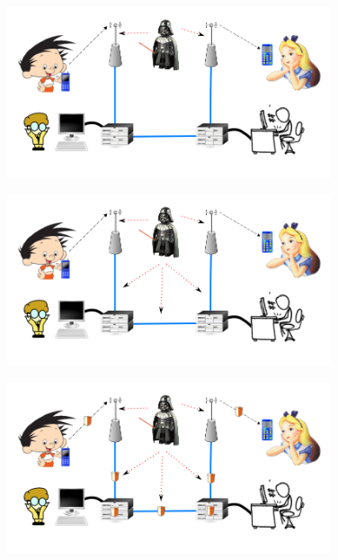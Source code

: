 \documentclass[notes,blue,mathserif]{beamer}
\begin{document}
\begin{frame}{}
\begin{figure}
	\centering
		\includegraphics[width=0.85\textwidth]{figuras/5.png}
	\label{fig:arq5}
\end{figure}
\end{frame}

\begin{frame}{}
\begin{figure}
	\centering
		\includegraphics[width=0.85\textwidth]{figuras/6.png}
	\label{fig:arq6}
\end{figure}
\end{frame}

\begin{frame}{}
\begin{figure}
	\centering
		\includegraphics[width=0.85\textwidth]{figuras/7.png}
	\label{fig:arq7}
\end{figure}
\end{frame}
\end{document}
